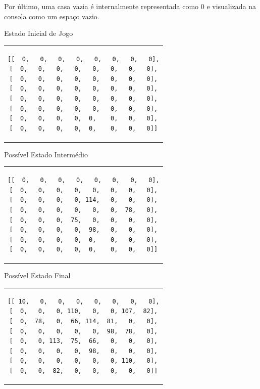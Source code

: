 \documentclass[a4paper]{article}
\begin{document}
Por último, uma casa vazia é internalmente representada como 0 e visualizada na consola como um espaço vazio. \newline

\large Estado Inicial de Jogo
\begin{small}
\begin{center}
\begin{tabular}{c}
\begin{lstlisting}
[[  0,   0,   0,   0,   0,   0,   0,   0],
[  0,   0,   0,   0,   0,   0,   0,   0],
[  0,   0,   0,   0,   0,   0,   0,   0],
[  0,   0,   0,   0,   0,   0,   0,   0],
[  0,   0,   0,   0,   0,   0,   0,   0],
[  0,   0,   0,   0,   0,   0,   0,   0],
[  0,   0,   0,   0,  0,    0,   0,   0],
[  0,   0,   0,   0,  0,    0,   0,   0]]
\end{lstlisting}
\end{tabular}
\end{center}
\end{small}

\large Possível Estado Intermédio
\begin{small}
\begin{center}
\begin{tabular}{c}
\begin{lstlisting}
[[  0,   0,   0,   0,   0,   0,   0,   0],
[  0,   0,   0,   0,   0,   0,   0,   0],
[  0,   0,   0,   0, 114,   0,   0,   0],
[  0,   0,   0,   0,   0,   0,  78,   0],
[  0,   0,   0,  75,   0,   0,   0,   0],
[  0,   0,   0,   0,  98,   0,   0,   0],
[  0,   0,   0,   0,  0,    0,   0,   0],
[  0,   0,   0,   0,  0,    0,   0,   0]]
\end{lstlisting}
\end{tabular}
\end{center}
\end{small}

\large Possível Estado Final
\begin{small}
\begin{center}
\begin{tabular}{c}
\begin{lstlisting}
[[ 10,   0,   0,   0,   0,   0,   0,   0],
[  0,   0,   0, 110,   0,   0, 107,  82],
[  0,  78,   0,  66, 114,  81,   0,   0],
[  0,   0,   0,   0,   0,  98,  78,   0],
[  0,   0, 113,  75,  66,   0,   0,   0],
[  0,   0,   0,   0,  98,   0,   0,   0],
[  0,   0,   0,   0,   0,   0, 110,   0],
[  0,   0,  82,   0,   0,   0,   0,   0]]
\end{lstlisting}
\end{tabular}
\end{center}
\end{small}
\end{document}
